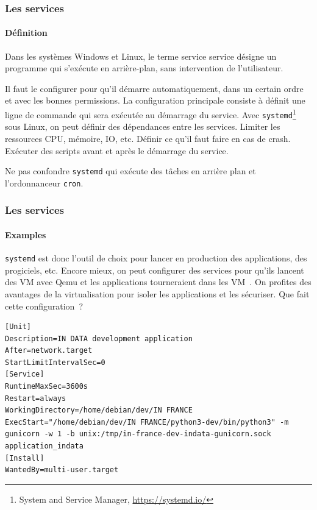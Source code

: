 \documentclass{beamer}
\begin{document}
    \begin{frame}
        \transdissolve
        \frametitle{Les services}
        \framesubtitle{Définition}
        Dans les systèmes Windows et Linux, le terme service service désigne un programme qui s'exécute en arrière-plan, sans intervention de l'utilisateur.

        Il faut le configurer pour qu'il démarre automatiquement, dans un certain ordre et avec les bonnes permissions.
        \bigbreak
        La configuration principale consiste à définit une ligne de commande qui sera exécutée au démarrage du service.
        \bigbreak
        Avec \lstinline{systemd}\footnote{System and Service Manager, \url{https://systemd.io/}} sous Linux, on peut définir des dépendances entre les services.
        Limiter les ressources CPU, mémoire, IO, etc.
        Définir ce qu'il faut faire en cas de crash.
        Exécuter des scripts avant et après le démarrage du service.
        \begin{dangercolorbox}
            Ne pas confondre \lstinline{systemd} qui exécute des tâches en arrière plan et l'ordonnanceur \lstinline{cron}.
        \end{dangercolorbox}
    \end{frame}

    \begin{frame}[fragile]
        \transdissolve
        \frametitle{Les services}
        \framesubtitle{Examples}
        \lstinline{systemd} est donc l'outil de choix pour lancer en production des applications, des progiciels, etc.
        \bigbreak
        Encore mieux, on peut configurer des services pour qu'ils lancent des VM avec Qemu et les applications tourneraient dans les VM~.
        On profites des avantages de la virtualisation pour isoler les applications et les sécuriser.
        \bigbreak
        Que fait cette configuration~?
        \begin{lstlisting}
[Unit]
Description=IN DATA development application
After=network.target
StartLimitIntervalSec=0
[Service]
RuntimeMaxSec=3600s
Restart=always
WorkingDirectory=/home/debian/dev/IN FRANCE
ExecStart="/home/debian/dev/IN FRANCE/python3-dev/bin/python3" -m gunicorn -w 1 -b unix:/tmp/in-france-dev-indata-gunicorn.sock application_indata
[Install]
WantedBy=multi-user.target
        \end{lstlisting}
    \end{frame}
\end{document}
